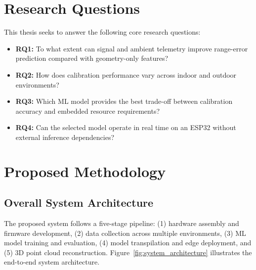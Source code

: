 \documentclass[12pt,a4paper]{article}
\begin{document}
    \section{Research Questions}

    This thesis seeks to answer the following core research questions:

    \begin{itemize}[leftmargin=0.35in]
        \item \textbf{RQ1:} To what extent can signal and ambient telemetry improve range-error prediction compared with geometry-only features?
        \item \textbf{RQ2:} How does calibration performance vary across indoor and outdoor environments?
        \item \textbf{RQ3:} Which ML model provides the best trade-off between calibration accuracy and embedded resource requirements?
        \item \textbf{RQ4:} Can the selected model operate in real time on an ESP32 without external inference dependencies?
    \end{itemize}



    \section{Proposed Methodology}

    \subsection{Overall System Architecture}

    The proposed system follows a five-stage pipeline: (1) hardware assembly and firmware development, (2) data collection across multiple environments, (3) ML model training and evaluation, (4) model transpilation and edge deployment, and (5) 3D point cloud reconstruction. Figure~\ref{fig:system_architecture} illustrates the end-to-end system architecture.
\end{document}
